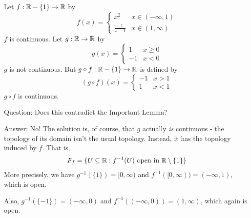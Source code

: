 \begin{example}
	 Let $f: \mathbb R-\{1\} \rightarrow \mathbb R$ by
	\[ f(x) = 
	\begin{cases}
		x^2 & x\in(-\infty, 1) \\
		\frac{-1}{x-1} & x\in (1, \infty) 
	\end{cases}
	\]
	$f$ is continuous. Let $g: \mathbb R \rightarrow \mathbb R$ by
	\[ g(x) = 
	\begin{cases}
		1 & x\ge 0 \\
		-1 & x < 0 
	\end{cases}
	\]
	$g$ is not continuous. But $g \circ f: \mathbb R-\{1\} \rightarrow \mathbb R$ is defined by
	\[ (g\circ f)(x) = 
	\begin{cases}
		-1 & x > 1 \\
		1 & x < 1 
	\end{cases}
	\]
	$g \circ f$ is continuous. 
\end{example}
Question: Does this contradict the Important Lemma?

Answer: No! The solution is, of course, that $g$ actually \emph{is} continuous - the topology of its domain isn't the usual topology. Instead, it has the topology induced by $f$. That is,
\[F_f = \{ U\subseteq \mathbb R : f^{-1}(U)\text{ open in }\mathbb R\setminus\{1\} \}\]
More precisely, we have $g^{-1}(\{ 1\}) = [0, \infty)$ and $f^{-1}([0, \infty)) = (-\infty,1)$, which is open.

Also, $g^{-1}( \{-1 \} ) = (-\infty,0)$ and $f^{-1}((-\infty, 0)) = (1, \infty)$, which again is open.

